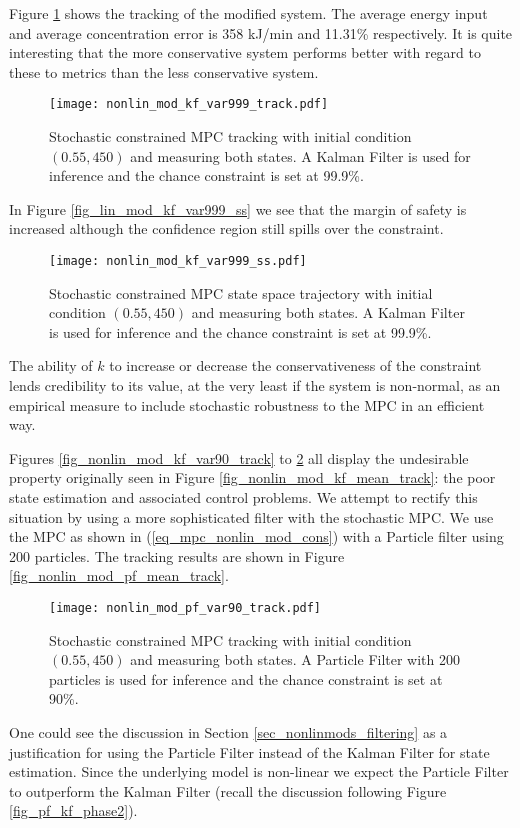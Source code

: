 Figure \ref{fig_nonlin_mod_kf_var999_track} shows the tracking of the modified system. The average energy input and average concentration error is 358 kJ/min and 11.31\% respectively. It is quite interesting that the more conservative system performs better with regard to these to metrics than the less conservative system.
\begin{figure}[H] 
\centering
\texttt{[image: nonlin\_mod\_kf\_var999\_track.pdf]}
\caption{Stochastic constrained MPC tracking with initial condition $(0.55, 450)$ and measuring both states. A Kalman Filter is used for inference and the chance constraint is set at 99.9\%.}
\label{fig_nonlin_mod_kf_var999_track}
\end{figure}
In Figure \ref{fig_lin_mod_kf_var999_ss} we see that the margin of safety is increased although the confidence region still spills over the constraint.
\begin{figure}[H] 
\centering
\texttt{[image: nonlin\_mod\_kf\_var999\_ss.pdf]}
\caption{Stochastic constrained MPC state space trajectory with initial condition $(0.55, 450)$ and measuring both states. A Kalman Filter is used for inference and the chance constraint is set at 99.9\%.}
\label{fig_nonlin_mod_kf_var999_ss}
\end{figure}
The ability of $k$ to increase or decrease the conservativeness of the constraint lends credibility to its value, at the very least if the system is non-normal, as an empirical measure to include stochastic robustness to the MPC in an efficient way.

Figures \ref{fig_nonlin_mod_kf_var90_track} to \ref{fig_nonlin_mod_kf_var999_ss} all display the undesirable property originally seen in Figure \ref{fig_nonlin_mod_kf_mean_track}: the poor state estimation and associated control problems. We attempt to rectify this situation by using a more sophisticated filter with the stochastic MPC. We use the MPC as shown in (\ref{eq_mpc_nonlin_mod_cons}) with a Particle filter using 200 particles. The tracking results are shown in Figure \ref{fig_nonlin_mod_pf_mean_track}. 
\begin{figure}[H] 
\centering
\texttt{[image: nonlin\_mod\_pf\_var90\_track.pdf]}
\caption{Stochastic constrained MPC tracking with initial condition $(0.55, 450)$ and measuring both states. A Particle Filter with 200 particles is used for inference and the chance constraint is set at 90\%.}
\label{fig_nonlin_mod_pf_var90_track}
\end{figure}
One could see the discussion in Section \ref{sec_nonlinmods_filtering} as a justification for using the Particle Filter instead of the Kalman Filter for state estimation. Since the underlying model is non-linear we expect the Particle Filter to outperform the Kalman Filter (recall the discussion following Figure \ref{fig_pf_kf_phase2}).

